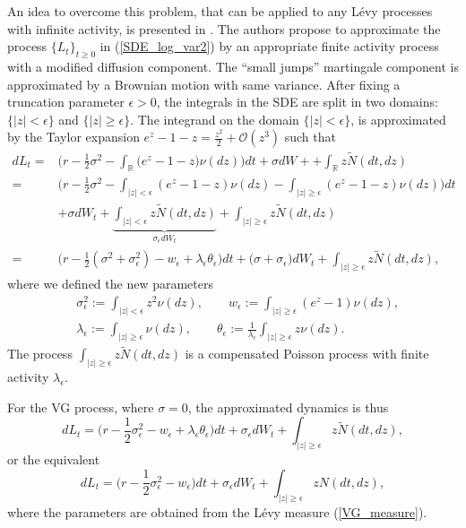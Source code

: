 \documentclass[a4paper,10pt]{article}
\newcommand{\numberset}{\mathbb}
\newcommand{\R}{\numberset{R}}
\begin{document}
An idea to overcome this problem, that can be applied to any Lévy processes with infinite activity, is presented in \cite{CoVo05b}. 
The authors propose to approximate the process $\{L_t\}_{t\geq0}$ in (\ref{SDE_log_var2}) by an
appropriate finite activity process with a modified diffusion component.
The ``small jumps'' martingale component is approximated by a Brownian motion with same variance.
After fixing a truncation parameter $\epsilon >0$, the integrals in the SDE are split in two domains: $\{|z|<\epsilon\}$ and $\{|z|\geq \epsilon\}$.
The integrand on the domain $\{ |z|<\epsilon \}$, is approximated by the Taylor expansion 
 $e^z-1-z = \frac{z^2}{2} + \mathcal{O}(z^3)$ such that
\begin{align}\label{log_sde_inf_act}\nonumber
  dL_t =& \biggl( r -\frac{1}{2}\sigma^2 - \int_{\R} \bigl( e^z-1-z \bigr) \nu(dz) \biggr)dt + \sigma dW + + \int_{\R} z \tilde N(dt,dz) \\ \nonumber
       =& \biggl( r - \frac{1}{2}\sigma^2 -\int_{|z|<\epsilon} (e^z-1-z) \nu(dz) -\int_{|z|\geq \epsilon} (e^z-1-z) \nu(dz)  \biggr) dt\\ \nonumber
        &+ \sigma dW_t + \underbrace{\int_{|z|< \epsilon} z \tilde N(dt,dz)}_{\sigma_{\epsilon} dW_t} + \int_{|z| \geq \epsilon} z \tilde N(dt,dz) \\ 
       =& \biggl( r - \frac{1}{2} (\sigma^2 + \sigma_{\epsilon}^2) - w_{\epsilon} + \lambda_{\epsilon} \theta_{\epsilon}  \biggr) dt + \bigl( \sigma+\sigma_{\epsilon}\bigr) dW_t 
       + \int_{|z|\geq \epsilon} z \tilde N(dt,dz) ,
\end{align}
where we defined the new parameters
\begin{align}\label{sig_eps}
 & \sigma_{\epsilon}^2 :=  \int_{|z| < \epsilon} z^2 \nu(dz), \quad \quad w_{\epsilon} := \int_{|z| \geq \epsilon} (e^z-1) \nu(dz), \\ \nonumber
 & \lambda_{\epsilon} :=  \int_{|z| \geq \epsilon} \nu(dz), \quad \quad \theta_{\epsilon} := \frac{1}{\lambda_{\epsilon}} \int_{|z| \geq \epsilon} z \nu(dz) .
\end{align}
The process $\int_{|z|\geq \epsilon} z \tilde N(dt,dz)$ is a compensated Poisson process with finite activity $\lambda_{\epsilon}$. 

For the VG process, where $\sigma = 0$, the approximated dynamics is thus
\begin{equation}\label{log_sde_VG}
dL_t = \biggl( r - \frac{1}{2} \sigma_{\epsilon}^2 - w_{\epsilon} + \lambda_{\epsilon} \theta_{\epsilon}  \biggr) dt 
       + \sigma_{\epsilon} dW_t + \int_{|z|\geq \epsilon} z \tilde N(dt,dz),
\end{equation}
or the equivalent
\begin{equation}
dL_t = \biggl( r - \frac{1}{2} \sigma_{\epsilon}^2 - w_{\epsilon}  \biggr) dt 
       + \sigma_{\epsilon} dW_t + \int_{|z|\geq \epsilon} z N(dt,dz),
\end{equation}
where the parameters are obtained from the Lévy measure (\ref{VG_measure}).
\end{document}
